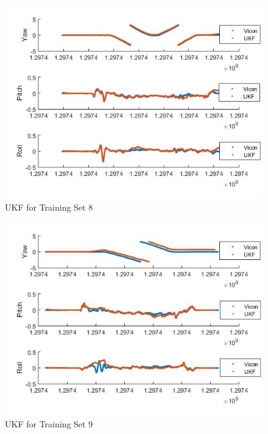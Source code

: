 \documentclass[fleqn,10pt]{SelfArx} %
\begin{document}
\begin{figure}[hbtp]
\centering
\includegraphics[scale=0.45]{8.jpg}
\caption{UKF for Training Set 8}
\label{fig:8}
\end{figure}

\begin{figure}[hbtp]
\centering
\includegraphics[scale=0.45]{9.jpg}
\caption{UKF for Training Set 9}
\label{fig:9}
\end{figure}
\end{document}
